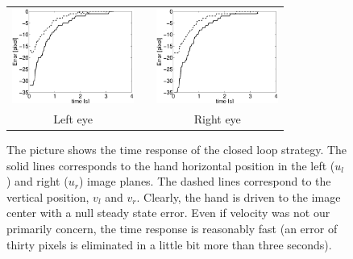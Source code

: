 \begin{figure}
  \begin{center}
	\begin{tabular}{ccc}
	  \parbox{40mm}{\includegraphics[width=40mm]{Figure/TimeReponseLeftClosedLoop.eps}}  & \hspace{2cm} &
	  \parbox{40mm}{\includegraphics[width=40mm]{Figure/TimeReponseRightClosedLoop.eps}}
	  \\
	  \parbox{40mm}{\centering Left eye } & \hspace{2cm} & \parbox{40mm}{\centering Right eye }
  \end{tabular}
\end{center}
\caption{The picture shows the time response of the closed loop strategy. The solid lines corresponds to the hand horizontal position in the left ($u_l$) and right ($u_r$) image planes. The dashed lines correspond to the vertical position, $v_l$ and $v_r$. Clearly, the hand is driven to the image center with a null steady state error. Even if velocity was not our primarily concern, the time response is reasonably fast (an error of thirty pixels is eliminated in a little bit more than three seconds). }\label{Fig:TimeResponseClosedLoopErrors}
  \end{figure}



